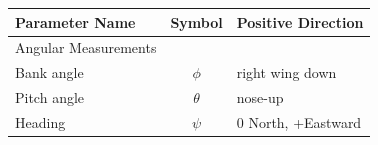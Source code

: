\documentclass[
]{book}
\begin{document}
\begin{longtable}[]{@{}lcl@{}}
\toprule
\begin{minipage}[b]{0.56\columnwidth}\raggedright
\textbf{Parameter Name}\strut
\end{minipage} & \begin{minipage}[b]{0.12\columnwidth}\centering
\textbf{Symbol}\strut
\end{minipage} & \begin{minipage}[b]{0.23\columnwidth}\raggedright
\textbf{Positive Direction}\strut
\end{minipage}\tabularnewline
\midrule
\endhead
\begin{minipage}[t]{0.56\columnwidth}\raggedright
Angular Measurements\strut
\end{minipage} & \begin{minipage}[t]{0.12\columnwidth}\centering
\strut
\end{minipage} & \begin{minipage}[t]{0.23\columnwidth}\raggedright
\strut
\end{minipage}\tabularnewline
\begin{minipage}[t]{0.56\columnwidth}\raggedright
Bank angle\strut
\end{minipage} & \begin{minipage}[t]{0.12\columnwidth}\centering
\(\phi\)\strut
\end{minipage} & \begin{minipage}[t]{0.23\columnwidth}\raggedright
right wing down\strut
\end{minipage}\tabularnewline
\begin{minipage}[t]{0.56\columnwidth}\raggedright
Pitch angle\strut
\end{minipage} & \begin{minipage}[t]{0.12\columnwidth}\centering
\(\theta\)\strut
\end{minipage} & \begin{minipage}[t]{0.23\columnwidth}\raggedright
nose-up\strut
\end{minipage}\tabularnewline
\begin{minipage}[t]{0.56\columnwidth}\raggedright
Heading\strut
\end{minipage} & \begin{minipage}[t]{0.12\columnwidth}\centering
\(\psi\)\strut
\end{minipage} & \begin{minipage}[t]{0.23\columnwidth}\raggedright
0 North, +Eastward\strut
\end{minipage}\tabularnewline

\end{longtable}
\end{document}
